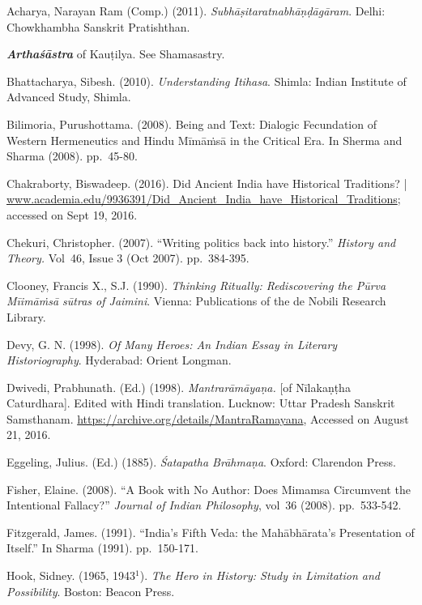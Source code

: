 \begin{thebibliography}{99}
 Acharya, Narayan Ram (Comp.) (2011). \textit{Subhāṣitaratnabhāṇḍāgāram}. Delhi: Chowkhambha Sanskrit Pratishthan.

  \textbf{\textit{Arthaśāstra}} of Kauṭilya. See Shamasastry.

  Bhattacharya, Sibesh. (2010). \textit{Understanding Itihasa}. Shimla: Indian Institute of Advanced Study, Shimla.

  Bilimoria, Purushottama. (2008). Being and Text: Dialogic Fecundation of Western Hermeneutics and Hindu Mīmāṁsā in the Critical Era. In Sherma and Sharma (2008). pp.~45-80.

  Chakraborty, Biswadeep. (2016). Did Ancient India have Historical Traditions? | \url{www.academia.edu/9936391/Did_Ancient_India_have_Historical_Traditions}; accessed on Sept 19, 2016.

  Chekuri, Christopher. (2007). “Writing politics back into history.” \textit{History and Theory.} Vol~46, Issue 3 (Oct 2007). pp.~384-395.

  Clooney, Francis X., S.J. (1990). \textit{Thinking Ritually: Rediscovering the Pūrva Mīimāṁsā sūtras of Jaimini}. Vienna: Publications of the de Nobili Research Library.

  Devy, G. N. (1998). \textit{Of Many Heroes: An Indian Essay in Literary Historiography}. Hyderabad: Orient Longman.

  Dwivedi, Prabhunath. (Ed.) (1998). \textit{Mantrarāmāyaṇa.} [of Nīlakaṇṭha Caturdhara]. Edited with Hindi translation. Lucknow: Uttar Pradesh Sanskrit Samsthanam. \url{https://archive.org/details/MantraRamayana}, Accessed on August 21, 2016.

  Eggeling, Julius. (Ed.) (1885). \textit{Śatapatha Brāhmaṇa}. Oxford: Clarendon Press.

  Fisher, Elaine. (2008). “A Book with No Author: Does Mimamsa Circumvent the Intentional Fallacy?” \textit{Journal of Indian Philosophy}, vol~36 (2008). pp.~533-542.

  Fitzgerald, James. (1991). “India’s Fifth Veda: the Mahābhārata’s Presentation of Itself.” In Sharma (1991). pp.~150-171.

  Hook, Sidney. (1965, 1943$^{1}$). \textit{The Hero in History: Study in Limitation and Possibility}. Boston: Beacon Press.


\end{thebibliography}
